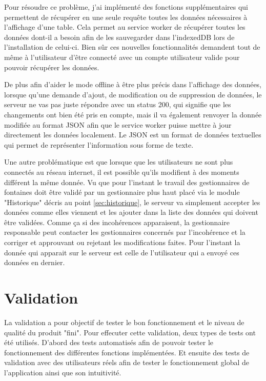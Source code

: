 \documentclass{EPL-master-thesis-covers-FR}
\begin{document}
				Pour résoudre ce problème, j'ai implémenté des fonctions supplémentaires qui permettent de récupérer en une seule requête toutes les données nécessaires à l'affichage d'une table. Cela permet au service worker de récupérer toutes les données dont-il a besoin afin de les sauvegarder dans l'indexedDB lors de l'installation de celui-ci. Bien sûr ces nouvelles fonctionnalités demandent tout de même à l'utilisateur d'être connecté avec un compte utilisateur valide pour pouvoir récupérer les données.
				
				De plus afin d'aider le mode offline à être plus précis dans l'affichage des données, lorsque qu'une demande d'ajout, de modification ou de suppression de données, le serveur ne vas pas juste répondre avec un status 200, qui signifie que les changements ont bien été pris en compte, mais il va également renvoyer la donnée modifiée au format JSON afin que le service worker puisse mettre à jour directement les données localement. Le JSON est un format de données textuelles qui permet de représenter l'information sous forme de texte. 
				
				Une autre problématique est que lorsque que les utilisateurs ne sont plus connectés au réseau internet, il est possible qu'ils modifient à des moments différent la même donnée. Vu que pour l'instant le travail des gestionnaires de fontaines doit être validé par un gestionnaire plus haut placé via le module "Historique" décris au point \ref{sec:historique}, le serveur va simplement accepter les données comme elles viennent et les ajouter dans la liste des données qui doivent être validées. Comme ça si des incohérences apparaisent, la gestionnaire responsable peut contacter les gestionnaires concernés par l'incohérence et la corriger et approuvant ou rejetant les modifications faites. Pour l'instant la donnée qui apparait sur le serveur est celle de l'utilisateur qui a envoyé ces données en dernier.
			

	\chapter{Validation}
		La validation a pour objectif de tester le bon fonctionnement et le niveau de qualité du produit "fini". Pour effecuter cette validation, deux types de tests ont été utilisés. D'abord des tests automatisés afin de pouvoir tester le fonctionnement des différentes fonctions implémentées. Et ensuite des tests  de validation avec des utilisateurs réels afin de tester le fonctionnement global de l'application ainsi que son intuitivité.
\end{document}
